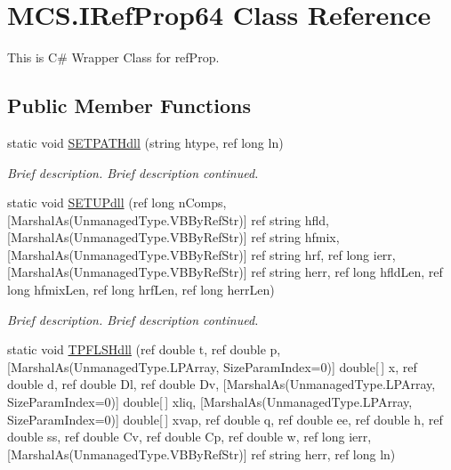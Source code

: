 \hypertarget{class_m_c_s_1_1_i_ref_prop64}{}\section{M\+C\+S.\+I\+Ref\+Prop64 Class Reference}
\label{class_m_c_s_1_1_i_ref_prop64}


This is C\# Wrapper Class for ref\+Prop.  


\subsection*{Public Member Functions}
\begin{DoxyCompactItemize}
\item 
static void \hyperlink{class_m_c_s_1_1_i_ref_prop64_aaa3dda6a52c6e8801344d53ff0b22045}{S\+E\+T\+P\+A\+T\+Hdll} (string htype, ref long ln)
\begin{DoxyCompactList}\small\item\em Brief description. Brief description continued. \end{DoxyCompactList}\item 
static void \hyperlink{class_m_c_s_1_1_i_ref_prop64_ad607be1bfa7cffbcfd5a8b7856965cc6}{S\+E\+T\+U\+Pdll} (ref long n\+Comps, \mbox{[}Marshal\+As(Unmanaged\+Type.\+V\+B\+By\+Ref\+Str)\mbox{]} ref string hfld, \mbox{[}Marshal\+As(Unmanaged\+Type.\+V\+B\+By\+Ref\+Str)\mbox{]} ref string hfmix, \mbox{[}Marshal\+As(Unmanaged\+Type.\+V\+B\+By\+Ref\+Str)\mbox{]} ref string hrf, ref long ierr, \mbox{[}Marshal\+As(Unmanaged\+Type.\+V\+B\+By\+Ref\+Str)\mbox{]} ref string herr, ref long hfld\+Len, ref long hfmix\+Len, ref long hrf\+Len, ref long herr\+Len)
\begin{DoxyCompactList}\small\item\em Brief description. Brief description continued. \end{DoxyCompactList}\item 
static void \hyperlink{class_m_c_s_1_1_i_ref_prop64_a126e52a573b76237231084e79e0537ce}{T\+P\+F\+L\+S\+Hdll} (ref double t, ref double p, \mbox{[}Marshal\+As(Unmanaged\+Type.\+L\+P\+Array, Size\+Param\+Index=0)\mbox{]} double\mbox{[}$\,$\mbox{]} x, ref double d, ref double Dl, ref double Dv, \mbox{[}Marshal\+As(Unmanaged\+Type.\+L\+P\+Array, Size\+Param\+Index=0)\mbox{]} double\mbox{[}$\,$\mbox{]} xliq, \mbox{[}Marshal\+As(Unmanaged\+Type.\+L\+P\+Array, Size\+Param\+Index=0)\mbox{]} double\mbox{[}$\,$\mbox{]} xvap, ref double q, ref double ee, ref double h, ref double ss, ref double Cv, ref double Cp, ref double w, ref long ierr, \mbox{[}Marshal\+As(Unmanaged\+Type.\+V\+B\+By\+Ref\+Str)\mbox{]} ref string herr, ref long ln)

\end{DoxyCompactItemize}
